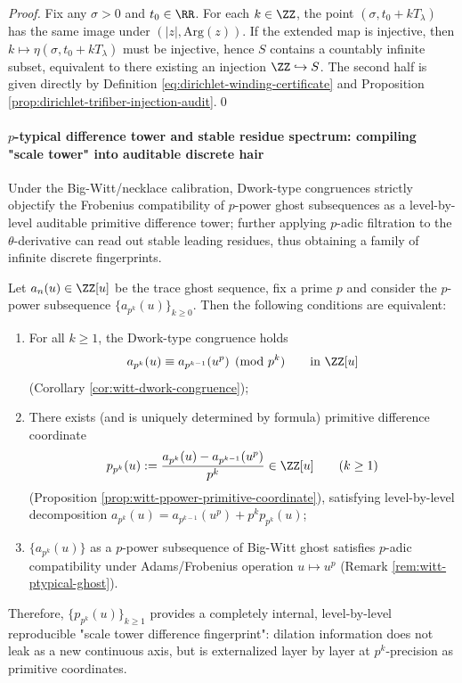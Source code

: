 \begin{proof}
Fix any \(\sigma>0\) and \(t_0\in\RR\). For each \(k\in\ZZ\), the point \((\sigma,t_0+kT_{\lambda})\) has the same image under \((|z|,\mathrm{Arg}(z))\).
If the extended map is injective, then \(k\mapsto \eta(\sigma,t_0+kT_{\lambda})\) must be injective, hence \(S\) contains a countably infinite subset, equivalent to there existing an injection \(\ZZ\hookrightarrow S\).
The second half is given directly by Definition \eqref{eq:dirichlet-winding-certificate} and Proposition \ref{prop:dirichlet-trifiber-injection-audit}.\qed
\end{proof}

\paragraph{\texorpdfstring{$p$}{p}-typical difference tower and stable residue spectrum: compiling "scale tower" into auditable discrete hair}
Under the Big-Witt/necklace calibration, Dwork-type congruences strictly objectify the Frobenius compatibility of \(p\)-power ghost subsequences as a level-by-level auditable primitive difference tower; further applying \(p\)-adic filtration to the \(\theta\)-derivative can read out stable leading residues, thus obtaining a family of infinite discrete fingerprints.

\begin{theorem}\label{thm:dephys-ptypical-primitive-tower}
Let \(a_n(u)\in\ZZ[u]\) be the trace ghost sequence, fix a prime \(p\) and consider the \(p\)-power subsequence \(\{a_{p^k}(u)\}_{k\ge 0}\).
Then the following conditions are equivalent:
\begin{enumerate}
  \item For all \(k\ge 1\), the Dwork-type congruence holds
  \[
  a_{p^k}(u)\equiv a_{p^{k-1}}(u^p)\pmod{p^k}\qquad\text{in}\ \ZZ[u]
  \]
  (Corollary \ref{cor:witt-dwork-congruence});
  \item There exists (and is uniquely determined by formula) primitive difference coordinate
  \[
  p_{p^k}(u):=\frac{a_{p^k}(u)-a_{p^{k-1}}(u^p)}{p^k}\in\ZZ[u]\qquad(k\ge 1)
  \]
  (Proposition \ref{prop:witt-ppower-primitive-coordinate}), satisfying level-by-level decomposition
  \(a_{p^k}(u)=a_{p^{k-1}}(u^p)+p^k p_{p^k}(u)\);
  \item \(\{a_{p^k}(u)\}\) as a \(p\)-power subsequence of Big-Witt ghost satisfies \(p\)-adic compatibility under Adams/Frobenius operation \(u\mapsto u^p\) (Remark \ref{rem:witt-ptypical-ghost}).
\end{enumerate}
Therefore, \(\{p_{p^k}(u)\}_{k\ge 1}\) provides a completely internal, level-by-level reproducible "scale tower difference fingerprint": dilation information does not leak as a new continuous axis, but is externalized layer by layer at \(p^k\)-precision as primitive coordinates.
\end{theorem}

